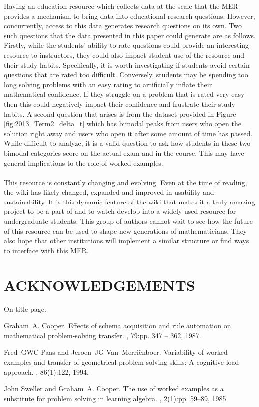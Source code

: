\documentclass{primus}
\begin{document}
\noindent{}Having an education resource which collects data at the scale that the MER provides a mechanism to bring data into educational research questions.  However, concurrently, access to this data generates research questions on its own.  Two such questions that the data presented in this paper could generate are as follows.  Firstly, while the students’ ability to rate questions could provide an interesting resource to instructors, they could also impact student use of the resource and their study habits.  Specifically, it is worth investigating if students avoid certain questions that are rated too difficult.  Conversely, students may be spending too long solving problems with an easy rating to artificially inflate their mathematical confidence.  If they struggle on a problem that is rated very easy then this could negatively impact their confidence and frustrate their study habits.  A second question that arises is from the dataset provided in Figure \ref{fig:2013_Term2_delta_t} which has bimodal peaks from users who open the solution right away and users who open it after some amount of time has passed.  While difficult to analyze, it is a valid question to ask how students in these two bimodal categories score on the actual exam and in the course.  This may have general implications to the role of worked examples.
\\\\
\noindent{}This resource is constantly changing and evolving. Even at the time of reading, the wiki has likely changed, expanded and improved in usability and sustainability. It is this dynamic feature of the wiki that makes it a truly amazing project to be a part of and to watch develop into a widely used resource for undergraduate students. This group of authors cannot wait to see how the future of this resource can be used to shape new generations of mathematicians.  They also hope that other institutions will implement a similar structure or find ways to interface with this MER.

\section{ACKNOWLEDGEMENTS}\label{sec:Acknowledgements}
On title page.


\begin{thebibliography}{1}

Graham~A. Cooper.
\newblock Effects of schema acquisition and rule automation on mathematical
problem-solving transfer.
, 79:pp. 347 -- 362, 1987.

Fred~GWC Paas and Jeroen~JG Van~Merri{\"e}nboer.
\newblock Variability of worked examples and transfer of geometrical
problem-solving skills: A cognitive-load approach.
, 86(1):122, 1994.

John Sweller and Graham~A. Cooper.
\newblock The use of worked examples as a substitute for problem solving in
learning algebra.
, 2(1):pp. 59--89, 1985.

\end{thebibliography}
\end{document}
